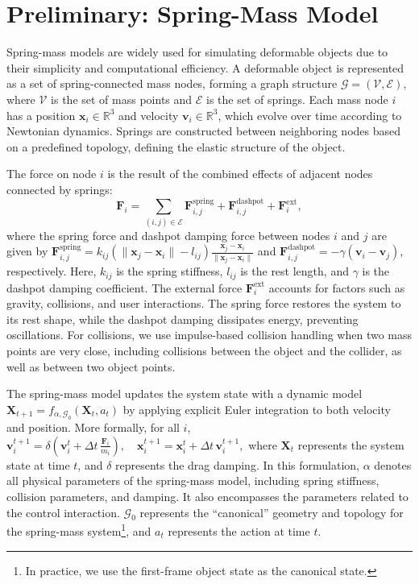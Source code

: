 \section{Preliminary: Spring-Mass Model}
\label{sec:preliminary}
Spring-mass models are widely used for simulating deformable objects due to their simplicity and computational efficiency. A deformable object is represented as a set of spring-connected mass nodes, forming a graph structure $\mathcal{G} = (\mathcal{V}, \mathcal{E})$, where $\mathcal{V}$ is the set of mass points and $\mathcal{E}$ is the set of springs. Each mass node $i$ has a position $\mathbf{x}_i \in \mathbb{R}^3$ and velocity $\mathbf{v}_i \in \mathbb{R}^3$, which evolve over time according to Newtonian dynamics. Springs are constructed between neighboring nodes based on a predefined topology, defining the elastic structure of the object.

The force on node $i$ is the result of the combined effects of adjacent nodes connected by springs:
\begin{equation}
\mathbf{F}_i = \sum_{(i, j) \in \mathcal{E}} \mathbf{F}_{i, j}^{\text{spring}} + \mathbf{F}_{i, j}^{\text{dashpot}} + \mathbf{F}_i^{\text{ext}},
\end{equation}
where the spring force and dashpot damping force between nodes $i$ and $j$ are given by $\mathbf{F}_{i, j}^{\text{spring}} = k_{ij} (\|\mathbf{x}_j - \mathbf{x}_i\| - l_{ij}) \frac{\mathbf{x}_j - \mathbf{x}_i}{\|\mathbf{x}_j - \mathbf{x}_i\|}$ and $\mathbf{F}_{i, j}^{\text{dashpot}} = -\gamma (\mathbf{v}_i - \mathbf{v}_j)$, respectively. Here, $k_{ij}$ is the spring stiffness, $l_{ij}$ is the rest length, and $\gamma$ is the dashpot damping coefficient. The external force $\mathbf{F}_i^{\text{ext}}$ accounts for factors such as gravity, collisions, and user interactions. The spring force restores the system to its rest shape, while the dashpot damping dissipates energy, preventing oscillations. For collisions, we use impulse-based collision handling when two mass points are very close, including collisions between the object and the collider, as well as between two object points.

The spring-mass model updates the system state with a dynamic model
$
\label{eq:transition}
\mathbf{X}_{t+1} = f_{\alpha, \mathcal{G}_0}(\mathbf{X}_{t}, a_t)
$
by applying explicit Euler integration to both velocity and position. More formally, for all $i$,
$\label{eq:state_update}
\mathbf{v}_i^{t+1} = \delta\left(\mathbf{v}_i^t + \Delta t\,\frac{\mathbf{F}_i}{m_i}\right), \quad
\mathbf{x}_i^{t+1} = \mathbf{x}_i^t + \Delta t\,\mathbf{v}_i^{t+1},$
where \(\mathbf{X}_t\) represents the system state at time \(t\), and $\delta$ represents the drag damping. In this formulation, \(\alpha\) denotes all physical parameters of the spring-mass model, including spring stiffness, collision parameters, and damping. It also encompasses the parameters related to the control interaction. \(\mathcal{G}_0\) represents the ``canonical'' geometry and topology for the spring-mass system\footnote{In practice, we use the first-frame object state as the canonical state.}, and \(a_t\) represents the action at time \(t\).
